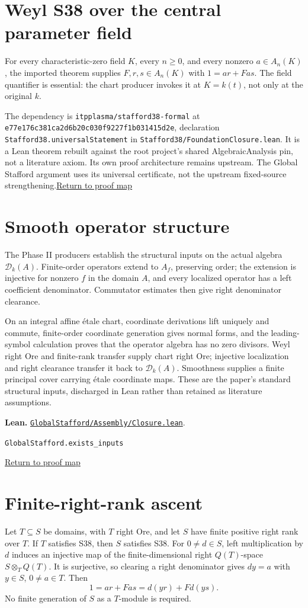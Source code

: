 \documentclass[11pt,a4paper]{article}
\newcommand{\code}[1]{\nolinkurl{#1}}
\newcommand{\D}{\mathcal D}
\newcommand{\backmap}{\hfill\hyperref[fig:map]{\small Return to proof map}}
\newcommand{\leanref}[2]{\par\smallskip\noindent\textbf{Lean.} \href{https://github.com/itpplasma/global-stafford-formal/blob/b21883a5b3d8f46922713049c3b060523ea3a771/#1}{\nolinkurl{#1}}.\par\noindent\small\code{#2}\par\normalsize\backmap}
\begin{document}
\section{Weyl S38 over the central parameter field}\label{sec:weyl}
For every characteristic-zero field $K$, every $n\ge0$, and every nonzero
$a\in A_n(K)$, the imported theorem supplies $F,r,s\in A_n(K)$ with
$1=ar+Fas$. The field quantifier is essential: the chart producer invokes it
at $K=k(t)$, not only at the original $k$.

The dependency is \code{itpplasma/stafford38-formal} at
\nolinkurl{e77e176c381ca2d6b20c030f9227f1b031415d2e}, declaration
\code{Stafford38.universalStatement} in \code{Stafford38/FoundationClosure.lean}.
It is a Lean theorem rebuilt against the root project's shared AlgebraicAnalysis
pin, not a literature axiom. Its own proof architecture remains upstream.
The Global Stafford argument uses its universal certificate, not the upstream
fixed-source strengthening.\backmap

\section{Smooth operator structure}\label{sec:structure}
The Phase II producers establish the structural inputs on the actual
algebra $\D_k(A)$. Finite-order operators extend to $A_f$, preserving order;
the extension is injective for nonzero $f$ in the domain $A$, and every
localized operator has a left coefficient denominator. Commutator estimates
then give right denominator clearance.

On an integral affine \'etale chart, coordinate derivations lift uniquely and
commute, finite-order coordinate generation gives normal forms, and the
leading-symbol calculation proves that the operator algebra has no zero
divisors. Weyl right Ore and finite-rank transfer supply chart right Ore;
injective localization and right clearance transfer it back to $\D_k(A)$.
Smoothness supplies a finite principal cover carrying \'etale coordinate maps.
These are the paper's standard structural inputs, discharged in Lean rather
than retained as literature assumptions.

\leanref{GlobalStafford/Assembly/Closure.lean}{GlobalStafford.exists_inputs}

\section{Finite-right-rank ascent}\label{sec:rank}
Let $T\subseteq S$ be domains, with $T$ right Ore, and let $S$ have finite
positive right rank over $T$. If $T$ satisfies S38, then $S$ satisfies S38.
For $0\ne d\in S$, left multiplication by $d$ induces an injective map of the
finite-dimensional right $Q(T)$-space $S\otimes_T Q(T)$. It is surjective,
so clearing a right denominator gives $dy=a$ with $y\in S$, $0\ne a\in T$.
Then
\[
1=ar+Fas=d(yr)+Fd(ys).
\]
No finite generation of $S$ as a $T$-module is required.
\end{document}
